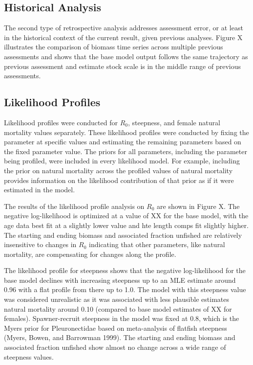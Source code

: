\documentclass[
]{scrartcl}
\begin{document}
\subsection{Historical Analysis}\label{historical-analysis}

The second type of retrospective analysis addresses assessment error, or
at least in the historical context of the current result, given previous
analyses. Figure X illustrates the comparison of biomass time series
across multiple previous assessments and shows that the base model
output follows the same trajectory as previous assessment and estimate
stock scale is in the middle range of previous assessments.

\subsection{Likelihood Profiles}\label{likelihood-profiles}

Likelihood profiles were conducted for \(R_0\), steepness, and female
natural mortality values separately. These likelihood profiles were
conducted by fixing the parameter at specific values and estimating the
remaining parameters based on the fixed parameter value. The priors for
all parameters, including the parameter being profiled, were included in
every likelihood model. For example, including the prior on natural
mortality across the profiled values of natural mortality provides
information on the likelihood contribution of that prior as if it were
estimated in the model.

The results of the likelihood profile analysis on \(R_0\) are shown in
Figure X. The negative log-likelihood is optimized at a value of XX for
the base model, with the age data best fit at a slightly lower value and
hte length comps fit slightly higher. The starting and ending biomass
and associated fraction unfished are relatively insensitive to changes
in \(R_0\) indicating that other parameters, like natural mortality, are
compensating for changes along the profile.

The likelihood profile for steepness shows that the negative
log-likelihood for the base model declines with increasing steepness up
to an MLE estimate around 0.96 with a flat profile from there up to 1.0.
The model with this steepness value was considered unrealistic as it was
associated with less plausible estimates natural mortality around 0.10
(compared to base model estimates of XX for females). Spawner-recruit
steepness in the model was fixed at 0.8, which is the Myers prior for
Pleuronectidae based on meta-analysis of flatfish steepness (Myers,
Bowen, and Barrowman 1999). The starting and ending biomass and
associated fraction unfished show almost no change across a wide range
of steepness values.
\end{document}
